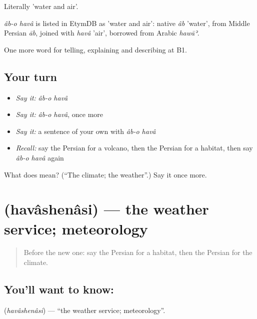 Literally 'water and air'.

\begin{cousinweb}
\emph{âb-o havâ} is listed in EtymDB as 'water and air': native \emph{âb} 'water', from Middle Persian \emph{āb}, joined with \emph{havâ} 'air', borrowed from Arabic \emph{hawāʾ}.
\end{cousinweb}

\begin{grammarlens}[title={What you've built}]
One more word for telling, explaining and describing at B1.
\end{grammarlens}

\subsection*{Your turn}
\begin{itemize}
\raggedright
  \item \emph{Say it:} \emph{âb-o havâ}
  \item \emph{Say it:} \emph{âb-o havâ}, once more
  \item \emph{Say it:} a sentence of your own with \emph{âb-o havâ}
  \item \emph{Recall:} say the Persian for a volcano, then the Persian for a habitat, then say \emph{âb-o havâ} again
\end{itemize}

\begin{tcolorbox}[breakable,colback=teal!4,colframe=teal!35!black,title={Before you move on}]
What does    mean? (\textquotedblleft{}The climate; the weather\textquotedblright{}.) Say it once more.
\end{tcolorbox}
\section[\texorpdfstring{\fa{هواشناسی} (havâshenâsi)}{هواشناسی (havâshenâsi)}]{ (havâshenâsi) — the weather service; meteorology}

\label{lesson:FA-C473-havashenasi}



\begin{quote}
Before the new one: say the Persian for a habitat, then the Persian for the climate.
\end{quote}

\subsection*{You'll want to know: }
\textbf{} (\emph{havâshenâsi}) — \textquotedblleft{}the weather service; meteorology\textquotedblright{}.

